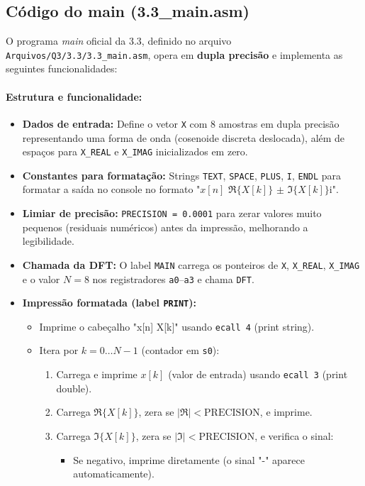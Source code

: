 \documentclass[12pt,a4paper]{article}
\begin{document}
\subsection*{Código do main (3.3\_main.asm)}
O programa \textit{main} oficial da 3.3, definido no arquivo \texttt{Arquivos/Q3/3.3/3.3\_main.asm}, opera em \textbf{dupla precisão} e implementa as seguintes funcionalidades:

\paragraph{Estrutura e funcionalidade:}
\begin{itemize}
  \item \textbf{Dados de entrada:} Define o vetor \texttt{X} com 8 amostras em dupla precisão representando uma forma de onda (cosenoide discreta deslocada), além de espaços para \texttt{X\_REAL} e \texttt{X\_IMAG} inicializados em zero.
  \item \textbf{Constantes para formatação:} Strings \texttt{TEXT}, \texttt{SPACE}, \texttt{PLUS}, \texttt{I}, \texttt{ENDL} para formatar a saída no console no formato "$x[n]$ $\Re\{X[k]\}$ $\pm$ $\Im\{X[k]\}$i".
  \item \textbf{Limiar de precisão:} \texttt{PRECISION = 0.0001} para zerar valores muito pequenos (residuais numéricos) antes da impressão, melhorando a legibilidade.
  \item \textbf{Chamada da DFT:} O label \texttt{MAIN} carrega os ponteiros de \texttt{X}, \texttt{X\_REAL}, \texttt{X\_IMAG} e o valor $N=8$ nos registradores \texttt{a0}–\texttt{a3} e chama \texttt{DFT}.
  \item \textbf{Impressão formatada (label \texttt{PRINT}):}
    \begin{itemize}
      \item Imprime o cabeçalho "x[n] X[k]" usando \texttt{ecall 4} (print string).
      \item Itera por $k=0 \dots N-1$ (contador em \texttt{s0}):
      \begin{enumerate}
        \item Carrega e imprime $x[k]$ (valor de entrada) usando \texttt{ecall 3} (print double).
        \item Carrega $\Re\{X[k]\}$, zera se $|\Re| < \text{PRECISION}$, e imprime.
        \item Carrega $\Im\{X[k]\}$, zera se $|\Im| < \text{PRECISION}$, e verifica o sinal:
          \begin{itemize}
            \item Se negativo, imprime diretamente (o sinal "-" aparece automaticamente).

\end{itemize}
\end{enumerate}
\end{itemize}
\end{itemize}
\end{document}
